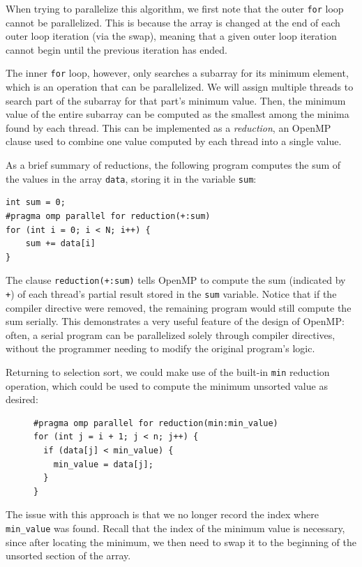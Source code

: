 \documentclass{article}
\theoremstyle{definition}
\begin{document}
When trying to parallelize this algorithm, we first note that the outer \texttt{for} loop cannot be parallelized. This is because the array is changed at the end of each outer loop iteration (via the swap), meaning that a given outer loop iteration cannot begin until the previous iteration has ended.

The inner \texttt{for} loop, however, only searches a subarray for its minimum element, which is an operation that can be parallelized. We will assign multiple threads to search part of the subarray for that part's minimum value. Then, the minimum value of the entire subarray can be computed as the smallest among the minima found by each thread. This can be implemented as a \emph{reduction}, an OpenMP clause used to combine one value computed by each thread into a single value.

As a brief summary of reductions, the following program computes the sum of the values in the array \texttt{data}, storing it in the variable \texttt{sum}:
\begin{verbatim}
int sum = 0;
#pragma omp parallel for reduction(+:sum)
for (int i = 0; i < N; i++) {
    sum += data[i]
}
\end{verbatim}

The clause \texttt{reduction(+:sum)} tells OpenMP to compute the sum (indicated by \texttt{+}) of each thread's partial result stored in the \texttt{sum} variable. Notice that if the compiler directive were removed, the remaining program would still compute the sum serially. This demonstrates a very useful feature of the design of OpenMP: often, a serial program can be parallelized solely through compiler directives, without the programmer needing to modify the original program's logic.

Returning to selection sort, we could make use of the built-in \texttt{min} reduction operation, which could be used to compute the minimum unsorted value as desired:

\begin{figure}[H]
\begin{verbatim}
#pragma omp parallel for reduction(min:min_value)
for (int j = i + 1; j < n; j++) {
  if (data[j] < min_value) {
    min_value = data[j];
  }
}
\end{verbatim}
\end{figure}

The issue with this approach is that we no longer record the index where \texttt{min\_value} was found. Recall that the index of the minimum value is necessary, since after locating the minimum, we then need to swap it to the beginning of the unsorted section of the array.
\end{document}
